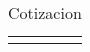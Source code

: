 \documentclass[../main.tex]{subfiles}
\begin{document}
\begin{table}[H]
  \centering
  \begin{tabular}{|l||c|c|c|}
    &&&
  \end{tabular}
  \caption{Cotizacion}\label{tab:cot}
\end{table}
\end{document}
